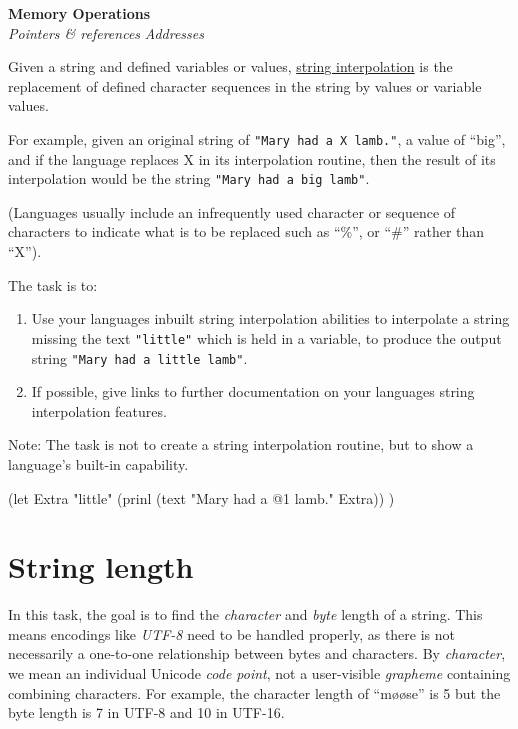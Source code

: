 \begin{itemize}
\textbf{Memory Operations} \\
\emph{Pointers \& references}
\textbar{} \emph{Addresses}

Given a string and defined variables or values,
\href{http://en.wikipedia.org/wiki/String\_literal\#Variable\_interpolation}{string
interpolation} is the replacement of defined character sequences in the
string by values or variable values.

For example, given an original string of \texttt{"Mary had a X lamb."},
a value of ``big'', and if the language replaces X in its interpolation
routine, then the result of its interpolation would be the string
\texttt{"Mary had a big lamb"}.

(Languages usually include an infrequently used character or sequence of
characters to indicate what is to be replaced such as ``\%'', or ``\#''
rather than ``X'').

The task is to:

\begin{enumerate}
\item
  Use your languages inbuilt string interpolation abilities to
  interpolate a string missing the text \texttt{"little"} which is held
  in a variable, to produce the output string
  \texttt{"Mary had a little lamb"}.
\item
  If possible, give links to further documentation on your languages
  string interpolation features.
\end{enumerate}

Note: The task is not to create a string interpolation routine, but to
show a language's built-in capability.



\begin{wideverbatim}

(let Extra "little"
   (prinl (text "Mary had a @1 lamb." Extra)) )

\end{wideverbatim}

\pagebreak{}
\section*{String length}

In this task, the goal is to find the \emph{character} and \emph{byte}
length of a string. This means encodings like \emph{UTF-8}
need to be handled properly, as there is not necessarily a one-to-one
relationship between bytes and characters. By \emph{character}, we mean
an individual Unicode \emph{code point}, not a user-visible
\emph{grapheme} containing combining characters. For example, the
character length of ``møøse'' is 5 but the byte length is 7 in UTF-8 and
10 in UTF-16.


\end{itemize}
